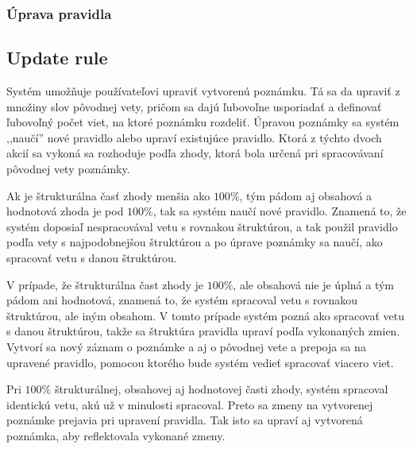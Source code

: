 %
%
{
	\subsubsection{Úprava pravidla}
}
{
	\subsection{Update rule}
}
\label{subsubsection:rule_update}
Systém umožňuje používateľovi upraviť vytvorenú poznámku. Tá sa da upraviť z množiny slov pôvodnej vety, pričom sa dajú ľubovoľne usporiadať a definovať ľubovoľný počet viet, na ktoré poznámku rozdeliť. Úpravou poznámky sa systém ,,naučí'' nové pravidlo alebo upraví existujúce pravidlo. Ktorá z týchto dvoch akcií sa vykoná sa rozhoduje podľa zhody, ktorá bola určená pri spracovávaní pôvodnej vety poznámky. 

Ak je štrukturálna časť zhody  menšia ako $100\%$, tým pádom aj obsahová a hodnotová zhoda je pod $100\%$, tak sa systém naučí nové pravidlo. Znamená to, že systém doposiaľ nespracovával vetu s rovnakou štruktúrou, a tak použil pravidlo podľa vety s najpodobnejšou štruktúrou a po úprave poznámky sa naučí, ako spracovať vetu s danou štruktúrou.

V prípade, že štrukturálna čast zhody je $100\%$, ale obsahová nie je úplná a tým pádom ani hodnotová, znamená to, že systém spracoval vetu s rovnakou štruktúrou, ale iným obsahom. V tomto prípade systém pozná ako spracovať vetu s danou štruktúrou, takže sa štruktúra pravidla upraví podľa vykonaných zmien. Vytvorí sa nový záznam o poznámke a aj o pôvodnej vete a prepoja sa na upravené pravidlo, pomocou ktorého bude systém vedieť spracovať viacero viet.

Pri $100\%$ štrukturálnej, obsahovej aj hodnotovej časti zhody, systém spracoval identickú vetu, akú už v minulosti spracoval. Preto sa zmeny na vytvorenej poznámke prejavia pri upravení pravidla. Tak isto sa upraví aj vytvorená poznámka, aby reflektovala vykonané zmeny.

